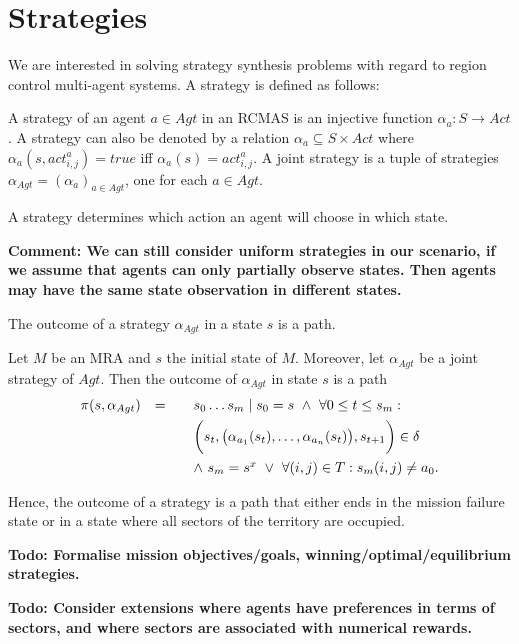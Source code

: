 \documentclass{llncs}
\begin{document}
\section{Strategies}
We are interested in solving strategy synthesis problems with regard to region control multi-agent systems.
A strategy is defined as follows:
  
         \begin{definition}[Strategy]
     A strategy  of an agent $a \in Agt$ in an RCMAS is an injective function $\alpha_a : S \rightarrow Act$. 
A strategy can also be denoted by a relation $\alpha_a \subseteq S \times Act$ where $\alpha_a(s,act^a_{i,j}) = true$ iff $\alpha_a(s) = act^a_{i,j}$. 
A joint strategy is a tuple of strategies $\alpha_{Agt} = (\alpha_a)_{a \in Agt}$, one for each $a \in Agt$.
  \end{definition}
  \noindent
A strategy determines which action an agent will choose  in which  state.  

\textbf{Comment: We can still consider uniform strategies in our scenario, if we assume that agents can only partially observe states. 
Then agents may have the same state observation in different states.}

  The outcome of a strategy $\alpha_{Agt}$ in a state $s$ is a path.
  
   \begin{definition}
   Let $M$ be an MRA and $s$ the initial state of $M$. 
   Moreover, let $\alpha_{Agt}$ be a joint strategy of $Agt$. Then the outcome of $\alpha_{Agt}$ in state $s$ is a path
  \[
  \begin{array}{lllll}
  \pi(s, \alpha_{Agt}) & = & & s_0 \ldots s_m \mid s_0 = s \ \wedge \ \forall  0 \leq t \leq s_m : \vspace*{1.5mm}\ \\
  & & & \bigg(s_t,\big(\alpha_{a_1}(s_t), \ldots, \alpha_{a_n}(s_t)\big),s_{t+1}\bigg) \in \delta \vspace*{1.5mm}\ \\ 
  & & & \wedge \ s_m = s^x \ \vee \ \forall (i,j) \in T : s_m(i,j) \neq a_0.
  \end{array}
  \]
   \end{definition}
   Hence, the outcome of a strategy is a path that either ends in the mission failure state or in a state where all sectors of the territory are occupied.  

\textbf{Todo: Formalise mission objectives/goals, winning/optimal/equilibrium strategies.
}

\textbf{Todo: Consider extensions where agents have preferences in terms of sectors, and where sectors are associated with numerical rewards.
}





\end{document}
